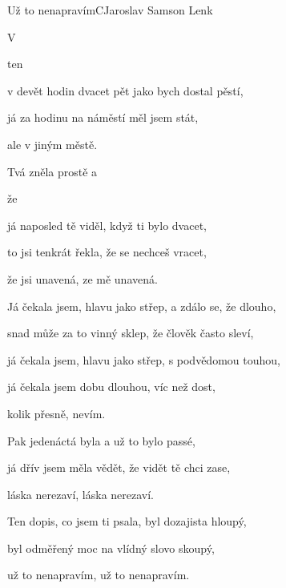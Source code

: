 \setcounter{page}{95}
\begin{song}{Už to nenapravím}{C}{Jaroslav Samson Lenk}

\begin{SBChorus}

   

\end{SBChorus}

\begin{SBVerse}

V 

ten 

v devět hodin dvacet pět jako bych dostal pěstí,

já za hodinu na náměstí měl jsem stát,

ale v jiným městě.

Tvá  zněla prostě a 

že 


já naposled tě viděl, když ti bylo dvacet,

to jsi tenkrát řekla, že se nechceš vracet,

že jsi unavená, ze mě unavená.

\end{SBVerse}

\begin{SBVerse}

Já čekala jsem, hlavu jako střep, a zdálo se, že dlouho,

snad může za to vinný sklep, že člověk často sleví,

já čekala jsem, hlavu jako střep, s podvědomou touhou,

já čekala jsem dobu dlouhou, víc než dost, 

kolik přesně, nevím.

Pak jedenáctá byla a už to bylo passé,

já dřív jsem měla vědět, že vidět tě chci zase,

láska nerezaví, láska nerezaví.

Ten dopis, co jsem ti psala, byl dozajista hloupý,

byl odměřený moc na vlídný slovo skoupý,

už to nenapravím, už to nenapravím.

\end{SBVerse}
\end{song}

\pagebreak
